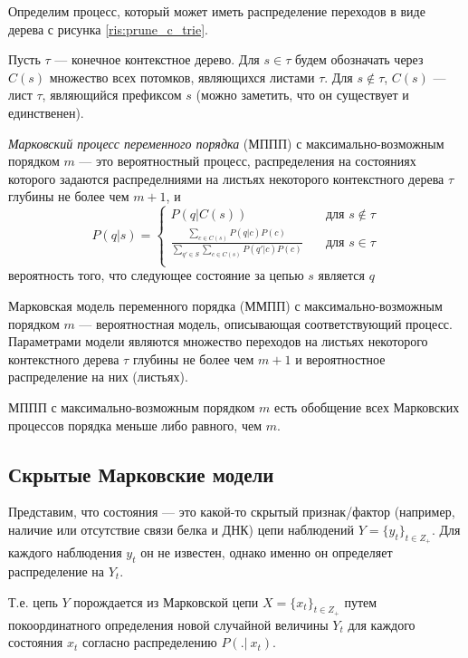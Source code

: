 \documentclass{matmex-diploma-custom}
\begin{document}
Определим процесс, который может иметь распределение переходов в виде дерева с рисунка \ref{ris:prune_c_trie}.

Пусть $\tau$ --- конечное контекстное дерево.
Для $s \in \tau$ будем обозначать через $ C(s) $ множество всех потомков, являющихся листами $\tau$. 
Для $s \notin \tau$, $C(s)$ --- лист $\tau$, являющийся префиксом  $s$ (можно заметить, что он существует и единственен).
\begin{definition}
\textit{Марковский процесс переменного порядка} (МППП) с максимально-возможным порядком $m$ --- это вероятностный процесс, распределения на состояниях которого задаются распределниями на листьях некоторого контекстного дерева $\tau$ глубины не более чем $m+1$, и 
\[ P(q |s) =
  \begin{cases}
    P(q|C(s))       & \quad \text{для } s \notin \tau\\
    \frac{\sum_{c \in C(s)} {P(q|c)P(c)}}{\sum_{q' \in S}\sum_{c \in C(s)} {P(q'|c)P(c)}} & \quad \text{для } s \in \tau\\
  \end{cases}
\]
вероятность того, что следующее состояние за цепью $s$ является $q$
\label{def:c_trie}
\end{definition}

\begin{definition}
Марковская модель переменного порядка (ММПП) с максимально-возможным порядком $m$ --- вероятностная модель, описывающая соответствующий процесс.
Параметрами модели являются множество переходов на листьях некоторого контекстного дерева $\tau$ глубины не более чем $m+1$ и вероятностное распределение на них (листьях).
\end{definition}

\begin{remark}
МППП с максимально-возможным порядком $m$ есть обобщение всех Марковских процессов порядка меньше либо равного, чем $ m $.
\end{remark}

\subsection{Скрытые Марковские модели}
Представим, что состояния --- это какой-то скрытый признак/фактор (например, наличие или отсутствие связи белка и ДНК) цепи наблюдений $Y = \{y_{t}\}_{t \in Z_{+}}$. Для каждого наблюдения $y_{t}$ он не известен, однако именно он определяет распределение на $Y_{t}$.

Т.е. цепь $Y$ порождается из Марковской цепи $X = \{x_{t}\}_{t \in Z_{+}}$ путем покоординатного определения новой случайной величины $Y_{t}$ для каждого состояния $x_{t}$ согласно распределению $P(.|~x_{t})$.
\end{document}
